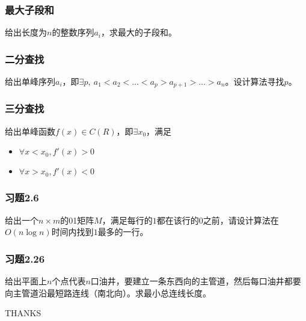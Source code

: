 \documentclass{ctexbeamer}
\begin{document}
    \begin{frame}
        \frametitle{最大子段和}

        给出长度为$n$的整数序列$a_i$，求最大的子段和。

    \end{frame}
    
    \begin{frame}
        \frametitle{二分查找}
        
        给出单峰序列$a_i$，即$\exists p,\ a_1 < a_2 < \ldots < a_p > a_{p+1} > \ldots > a_n$。设计算法寻找$p$。
        
    \end{frame}
    
    \begin{frame}
        \frametitle{三分查找}
        
        给出单峰函数$f(x)\in C(R)$，即$\exists x_0$，满足
        
        \begin{itemize}
            \item $\forall x < x_0, f'(x) > 0$
            \item $\forall x > x_0, f'(x) < 0$
        \end{itemize}
        
    \end{frame}
    
    \begin{frame}
        \frametitle{习题2.6}
        
        给出一个$n\times m$的01矩阵$M$，满足每行的$1$都在该行的$0$之前，请设计算法在$O(n\log n)$时间内找到$1$最多的一行。
        
    \end{frame}
    
    \begin{frame}
        \frametitle{习题2.26}
        
        给出平面上$n$个点代表$n$口油井，要建立一条东西向的主管道，然后每口油井都要向主管道沿最短路连线（南北向）。求最小总连线长度。
        
    \end{frame}

    \begin{frame}
        THANKS
    \end{frame}
    
\end{document}
